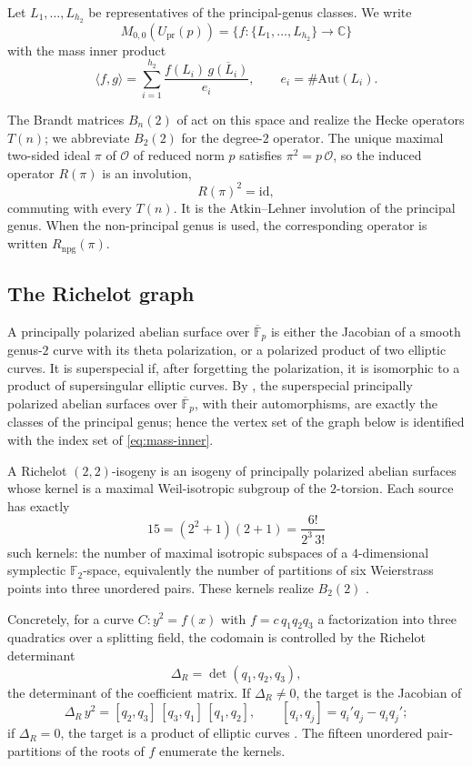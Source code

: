 \documentclass[11pt]{amsart}
\theoremstyle{plain}
\theoremstyle{definition}
\newcommand{\F}{\mathbb{F}}
\newcommand{\C}{\mathbb{C}}
\newcommand{\Aut}{\mathrm{Aut}}
\newcommand{\Upr}{U_{\mathrm{pr}}}
\newcommand{\Onorm}{\mathcal{O}}
\providecommand{\Upr}{U_{\mathrm{pr}}}
\begin{document}
	Let $L_1,\ldots,L_{h_2}$ be representatives of the principal-genus classes.
	We write
	\[
	M_{0,0}(\Upr(p))=\{f:\{L_1,\ldots,L_{h_2}\}\to\C\}
	\]
	with the mass inner product
	\begin{equation}\label{eq:mass-inner}
		\langle f,g\rangle
		=\sum_{i=1}^{h_2}\frac{f(L_i)\,\overline{g(L_i)}}{e_i},
		\qquad e_i=\#\Aut(L_i).
	\end{equation}
	
	The Brandt matrices $B_n(2)$ of \cite{Hashimoto1980} act on this space and
	realize the Hecke operators $T(n)$; we abbreviate $B_2(2)$ for the
	degree-$2$ operator. The unique maximal two-sided ideal $\pi$ of $\Onorm$
	of reduced norm $p$ satisfies $\pi^2=p\,\Onorm$, so the induced operator
	$R(\pi)$ is an involution,
	\[
	R(\pi)^2=\mathrm{id},
	\]
	commuting with every $T(n)$. It is the Atkin--Lehner involution of the
	principal genus. When the non-principal genus is used, the corresponding
	operator is written $R_{\mathrm{npg}}(\pi)$.
	
	\subsection{The Richelot graph}
	\label{ss:richelot-graph}
	
	A principally polarized abelian surface over $\overline{\F}_p$ is either
	the Jacobian of a smooth genus-$2$ curve with its theta polarization, or a
	polarized product of two elliptic curves. It is superspecial if, after
	forgetting the polarization, it is isomorphic to a product of supersingular
	elliptic curves. By \cite[\S1]{IKO1986}, the superspecial principally
	polarized abelian surfaces over $\overline{\F}_p$, with their
	automorphisms, are exactly the classes of the principal genus; hence the
	vertex set of the graph below is identified with the index set of
	\eqref{eq:mass-inner}.
	
	A Richelot $(2,2)$-isogeny is an isogeny of principally polarized abelian
	surfaces whose kernel is a maximal Weil-isotropic subgroup of the
	$2$-torsion. Each source has exactly
	\begin{equation}\label{eq:fifteen}
		15=(2^2+1)(2+1)=\frac{6!}{2^3\,3!}
	\end{equation}
	such kernels: the number of maximal isotropic subspaces of a
	$4$-dimensional symplectic $\F_2$-space, equivalently the number of
	partitions of six Weierstrass points into three unordered pairs. These
	kernels realize $B_2(2)$ \cite{KatsuraTakashima}.
	
	Concretely, for a curve $C:y^2=f(x)$ with $f=c\,q_1q_2q_3$ a factorization
	into three quadratics over a splitting field, the codomain is controlled by
	the Richelot determinant
	\[
	\Delta_R=\det(q_1,q_2,q_3),
	\]
	the determinant of the coefficient matrix. If $\Delta_R\ne0$, the target is
	the Jacobian of
	\[
	\Delta_R\,y^2=[q_2,q_3]\,[q_3,q_1]\,[q_1,q_2],
	\qquad [q_i,q_j]=q_i'q_j-q_iq_j';
	\]
	if $\Delta_R=0$, the target is a product of elliptic curves
	\cite[\S8]{JordanZaytman}. The fifteen unordered pair-partitions of the
	roots of $f$ enumerate the kernels.
	
\end{document}

